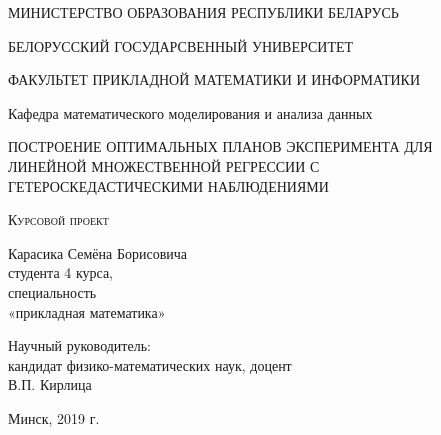 \begin{titlepage}
	\begin{center}
		\large
		МИНИСТЕРСТВО ОБРАЗОВАНИЯ РЕСПУБЛИКИ БЕЛАРУСЬ
		
		\vspace{0.5cm}
		
		БЕЛОРУССКИЙ ГОСУДАРСВЕННЫЙ УНИВЕРСИТЕТ
		\vspace{0.5cm}
		
		ФАКУЛЬТЕТ ПРИКЛАДНОЙ МАТЕМАТИКИ И ИНФОРМАТИКИ
		
		\vspace{0.25cm}
		
		Кафедра математического моделирования и анализа данных
		\vfill
		
		{\LARGE ПОСТРОЕНИЕ ОПТИМАЛЬНЫХ ПЛАНОВ ЭКСПЕРИМЕНТА ДЛЯ ЛИНЕЙНОЙ МНОЖЕСТВЕННОЙ РЕГРЕССИИ С ГЕТЕРОСКЕДАСТИЧЕСКИМИ  НАБЛЮДЕНИЯМИ}
		\bigskip
		
		\textsc{Курсовой проект}\\
	\end{center}
	\vfill
	
	\newlength{\ML}
	\hfill\begin{minipage}{0.5\textwidth}
		Карасика Семёна Борисовича\\
		студента 4 курса,\\
		специальность\\
		«прикладная математика»\\
	\end{minipage}%
	\bigskip
	
	\hfill\begin{minipage}{0.5\textwidth}
		Научный руководитель:\\
		кандидат физико-математических наук, доцент\\В.П. Кирлица
	\end{minipage}%
	\vfill
	
	\begin{center}
		Минск, 2019 г.
	\end{center}
\end{titlepage}